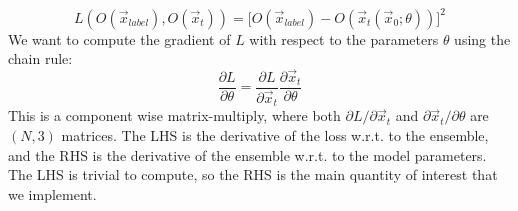 \documentclass{article}
\begin{document}
\begin{equation}
L(O(\vec{x}_{label}), O(\vec{x}_t)) = \lbrack O(\vec{x}_{label}) - O(\vec{x}_t(\vec{x}_0;\theta)) \rbrack ^2
\end{equation}
We want to compute the gradient of $L$ with respect to the parameters $\theta$ using the chain rule:
\begin{equation}
\dfrac {\partial L}{\partial \theta} = \dfrac{\partial L}{\partial \vec{x}_t} \dfrac{\partial \vec{x}_t}{\partial \theta} 
\end{equation}
This is a component wise matrix-multiply, where both $\partial L / \partial \vec{x}_t$ and ${\partial \vec{x}_t}/{\partial \theta}$ are $(N, 3)$ matrices. The LHS is the derivative of the loss w.r.t. to the ensemble, and the RHS is the derivative of the ensemble w.r.t. to the model parameters. The LHS is trivial to compute, so the RHS is the main quantity of interest that we implement.
\end{document}
